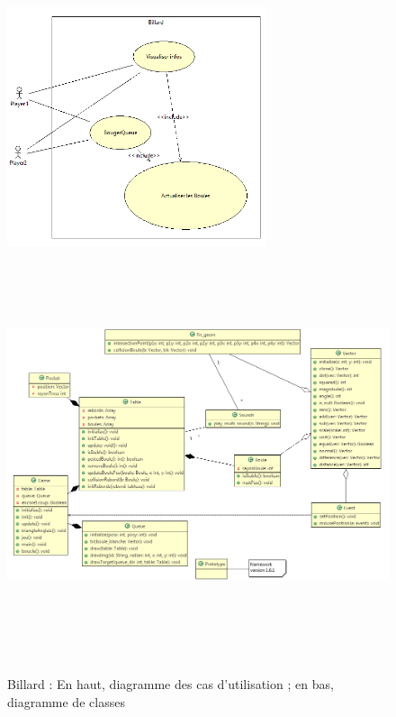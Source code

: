 \begin{figure}[h]
 \centering
 \includegraphics[height=7cm]{../umls/UML_images/Billard/utilisation} \hfill
 \includegraphics[width=\textwidth,height=12cm]{../umls/UML_images/Billard/class} \hfill
 \caption{Billard : En haut, diagramme des cas d'utilisation ; en bas, diagramme de classes}
\end{figure}

